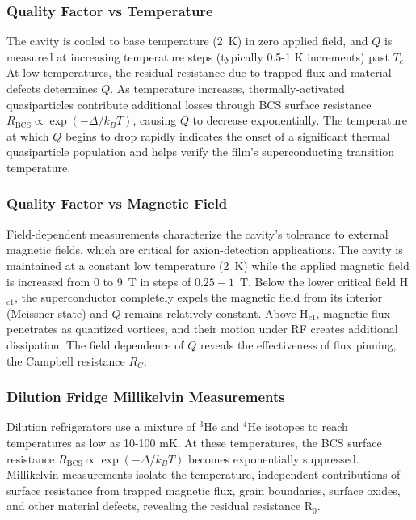     \subsubsection{Quality Factor vs Temperature}
            
    The cavity is cooled to base temperature (2~K) in zero applied field, and $Q$ is measured at increasing temperature steps (typically 0.5-1 K increments) past $T_c$. At low temperatures, the residual resistance due to trapped flux and material defects determines $Q$. As temperature increases, thermally-activated quasiparticles contribute additional losses through BCS surface resistance $R_\text{BCS} \propto \exp(-\Delta/k_BT)$, causing $Q$ to decrease exponentially. The temperature at which $Q$ begins to drop rapidly indicates the onset of a significant thermal quasiparticle population and helps verify the film's superconducting transition temperature.
    
    \subsubsection{Quality Factor vs Magnetic Field}
    
    Field-dependent measurements characterize the cavity's tolerance to external magnetic fields, which are critical for axion-detection applications. The cavity is maintained at a constant low temperature (2~K) while the applied magnetic field is increased from 0 to 9~T in steps of $0.25-1$~T. Below the lower critical field H$_{c1}$, the superconductor completely expels the magnetic field from its interior (Meissner state) and $Q$ remains relatively constant. Above H$_{c1}$, magnetic flux penetrates as quantized vortices, and their motion under RF creates additional dissipation. The field dependence of $Q$ reveals the effectiveness of flux pinning, the Campbell resistance $R_C$. 

    
    \subsubsection{Dilution Fridge Millikelvin Measurements}
    
    Dilution refrigerators use a mixture of $^3$He and $^4$He isotopes to reach temperatures as low as 10-100 mK. At these temperatures, the BCS surface resistance $R_\text{BCS} \propto \exp(-\Delta/k_BT)$ becomes exponentially suppressed. Millikelvin measurements isolate the temperature, independent contributions of surface resistance from trapped magnetic flux, grain boundaries, surface oxides, and other material defects, revealing the residual resistance R$_{0}$.
    
